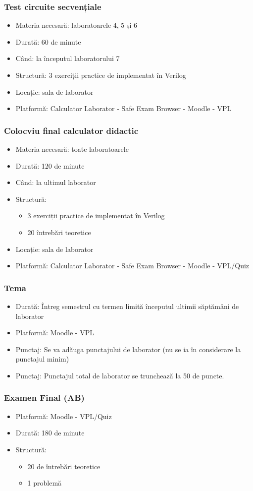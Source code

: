 \begin{frame}
\frametitle{Test circuite secvențiale}

\begin{itemize}
    \item Materia necesară: laboratoarele 4, 5 și 6
    \item Durată: 60 de minute
    \item Când: la începutul laboratorului 7
    \item Structură: 3 exerciții practice de implementat în Verilog
    \item Locație: sala de laborator
    \item Platformă: Calculator Laborator - Safe Exam Browser - Moodle - VPL
\end{itemize}
\end{frame}

\begin{frame}
\frametitle{Colocviu final calculator didactic}

\begin{itemize}
    \item Materia necesară: toate laboratoarele
    \item Durată: 120 de minute
    \item Când: la ultimul laborator
    \item Structură:
    \begin{itemize}
        \item 3 exerciții practice de implementat în Verilog
        \item 20 întrebări teoretice
    \end{itemize}
    \item Locație: sala de laborator
    \item Platformă: Calculator Laborator - Safe Exam Browser - Moodle - VPL/Quiz
\end{itemize}
\end{frame}

\begin{frame}
\frametitle{Tema}

\begin{itemize}
    \item Durată: Întreg semestrul cu termen limită începutul ultimii săptămâni de laborator
    \item Platformă: Moodle - VPL
    \item Punctaj: Se va adăuga punctajului de laborator (nu se ia în considerare la punctajul minim)
    \item Punctaj: Punctajul total de laborator se trunchează la 50 de puncte.
\end{itemize}
\end{frame}

\begin{frame}
\frametitle{Examen Final (AB)}

\begin{itemize}
    \item Platformă: Moodle - VPL/Quiz
    \item Durată: 180 de minute
    \item Structură:
    \begin{itemize}
        \item 20 de întrebări teoretice
        \item 1 problemă
    \end{itemize}
\end{itemize}
\end{frame}
